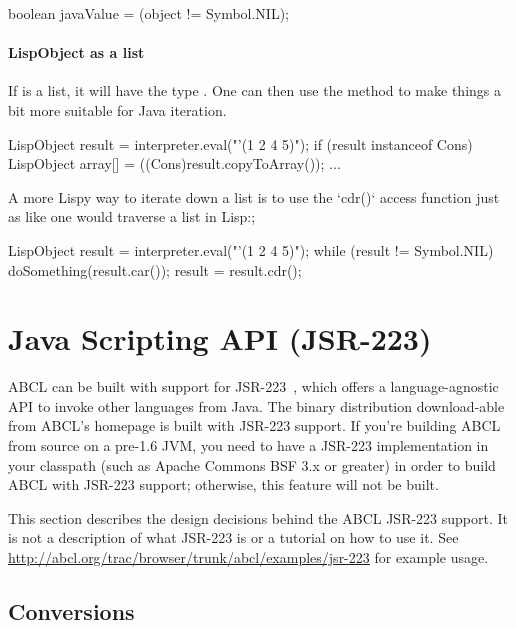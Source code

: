 \documentclass[10pt]{book}
\begin{document}
\begin{listing-java}
    boolean javaValue = (object != Symbol.NIL);
\end{listing-java}

\paragraph{LispObject as a list}

If  is a list, it will have the type .  One
can then use the  method to make things a bit more
suitable for Java iteration.

\begin{listing-java}
  LispObject result = interpreter.eval("'(1 2 4 5)");
  if (result instanceof Cons) {
    LispObject array[] = ((Cons)result.copyToArray());
    ...
  }
\end{listing-java}

A more Lispy way to iterate down a list is to use the `cdr()` access
function just as like one would traverse a list in Lisp:;

\begin{listing-java}
  LispObject result = interpreter.eval("'(1 2 4 5)");
  while (result != Symbol.NIL) {
    doSomething(result.car());
    result = result.cdr();
  }
\end{listing-java}

\section{Java Scripting API (JSR-223)}
\label{sec:java-scripting-api}

ABCL can be built with support for JSR-223~\cite{jsr-223}, which offers
a language-agnostic API to invoke other languages from Java. The binary
distribution download-able from ABCL's homepage is built with JSR-223
support. If you're building ABCL from source on a pre-1.6 JVM, you need
to have a JSR-223 implementation in your classpath (such as Apache
Commons BSF 3.x or greater) in order to build ABCL with JSR-223 support;
otherwise, this feature will not be built.

This section describes the design decisions behind the ABCL JSR-223
support. It is not a description of what JSR-223 is or a tutorial on
how to use it. See
\url{http://abcl.org/trac/browser/trunk/abcl/examples/jsr-223}
for example usage.

\subsection{Conversions}
\end{document}
